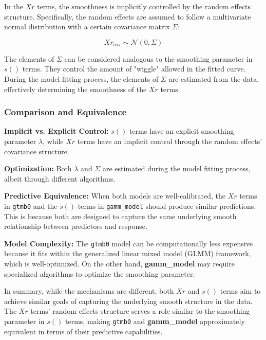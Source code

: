 In the \(Xr\) terms, the smoothness is implicitly controlled by the random effects structure. Specifically, the random effects are assumed to follow a multivariate normal distribution with a certain covariance matrix \(\Sigma\):

\[
Xr_{\text{cov}} \sim \mathcal{N}(0, \Sigma)
\]

The elements of \(\Sigma\) can be considered analogous to the smoothing parameter in \(s()\) terms. They control the amount of "wiggle" allowed in the fitted curve. During the model fitting process, the elements of \(\Sigma\) are estimated from the data, effectively determining the smoothness of the \(Xr\) terms.

\subsubsection{Comparison and Equivalence}

\textbf{Implicit vs. Explicit Control:} \(s()\) terms have an explicit smoothing parameter \(\lambda\), while \(Xr\) terms have an implicit control through the random effects' covariance structure.
\newline

\textbf{Optimization:} Both \(\lambda\) and \(\Sigma\) are estimated during the model fitting process, albeit through different algorithms.
\newline

\textbf{Predictive Equivalence:} When both models are well-calibrated, the \(Xr\) terms in \texttt{gtmb0} and the \(s()\) terms in \texttt{gamm\_model} should produce similar predictions. This is because both are designed to capture the same underlying smooth relationship between predictors and response.
\newline

\textbf{Model Complexity:} The \texttt{gtmb0} model can be computationally less expensive because it fits within the generalized linear mixed model (GLMM) framework, which is well-optimized. On the other hand, \textbf{gamm\_model} may require specialized algorithms to optimize the smoothing parameter.

In summary, while the mechanisms are different, both \(Xr\) and \(s()\) terms aim to achieve similar goals of capturing the underlying smooth structure in the data. The \(Xr\) terms' random effects structure serves a role similar to the smoothing parameter in \(s()\) terms, making \texttt{gtmb0} and \textbf{gamm\_model} approximately equivalent in terms of their predictive capabilities.



